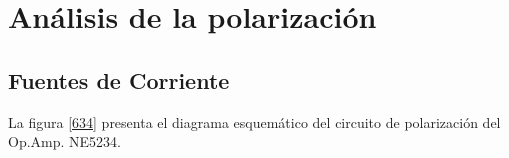 \documentclass[12pt,a4paper,final,headinclude,footinclude,BCOR5mm]{scrartcl}
\title{\normalfont\spacedallcaps{Amplificador Operacional NE5234}}
\author{\spacedlowsmallcaps{A. C. R. Tulic}}
\date{}
\begin{document}

\renewcommand{\sectionmark}[1]{\markright{\spacedlowsmallcaps{#1}}} 
\lehead{\mbox{\llap{\small\thepage\kern1em\color{halfgray} \vline}\color{halfgray}\hspace{0.5em}\rightmark\hfil}} %

\renewcommand*\contentsname{Contenido}
\renewcommand*\listfigurename{Figuras}
\renewcommand*\listtablename{Tablas}

\pagestyle{scrheadings} %


\maketitle %

\setcounter{tocdepth}{2} %

\tableofcontents %

\listoffigures %


\section{Análisis de la polarización}

\subsection{Fuentes de Corriente}

La figura \ref{634} presenta el diagrama esquemático del circuito de polarización del Op.Amp. NE5234.
\end{document}
